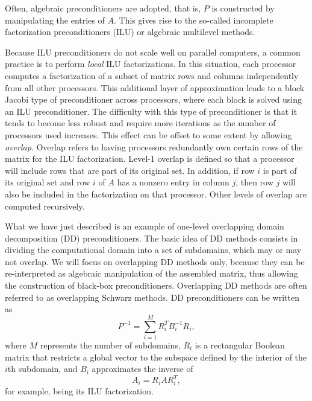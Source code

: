 \documentclass[10pt,relax]{SANDreport}
\begin{document}
Often, algebraic preconditioners are adopted, that is, $P$ is constructed by
manipulating the entries of $A$. This gives rise to the so-called incomplete
factorization preconditioners (ILU) or algebraic multilevel methods. 

Because ILU preconditioners do not scale well on parallel computers, a common
practice is to perform {\em local} ILU factorizations.  In this situation,
each processor computes a factorization of a subset of matrix rows and
columns independently from all other processors.  This additional layer of
approximation leads to a block Jacobi type of preconditioner across
processors, where each block is solved using an ILU preconditioner.  The
difficulty with this type of preconditioner is that it tends to become less
robust and require more iterations as the number of processors used
increases.  This effect can be offset to some extent by allowing {\em
overlap}.  Overlap refers to having processors redundantly own certain
rows of the matrix for the ILU factorization.  Level-1 overlap is defined
so that a processor will include rows that are part of its original set.
In addition, if row $i$ is part of its original set and row $i$ of $A$ has
a nonzero entry in column $j$, then row $j$ will also be included in the
factorization on that processor.  Other levels of overlap are computed
recursively. 

What we have just described is an example of one-level overlapping domain
decomposition (DD) preconditioners.  The basic idea of DD methods consists in
dividing the computational domain into a set of subdomains, which may or may
not overlap. We will focus on overlapping DD methods only, because they can be
re-interpreted as algebraic manipulation of the assembled matrix, thus
allowing the construction of black-box preconditioners. Overlapping DD methods
are often referred to as overlapping Schwarz methods. DD preconditioners can
be written as
\begin{equation}
  \label{eq:prec_dd}
  P^{-1} = \sum_{i=1}^M R_i^T B_i^{-1} R_i,
\end{equation}
where $M$ represents the number of subdomains,
$R_i$ is a rectangular Boolean matrix that restricts
a global vector to the subspace defined by the interior of the $i$th
subdomain, and $B_i$ approximates the inverse of 
\begin{equation}
  \label{eq:aztecoo_tilde_a}
  A_i = R_i A R_i^T ,
\end{equation}
for example, being its ILU factorization.
\end{document}
